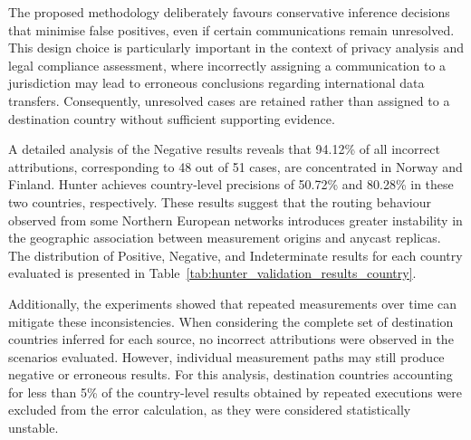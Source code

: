 The proposed methodology deliberately favours conservative inference decisions that minimise false positives, even if certain communications remain unresolved. This design choice is particularly important in the context of privacy analysis and legal compliance assessment, where incorrectly assigning a communication to a jurisdiction may lead to erroneous conclusions regarding international data transfers. Consequently, unresolved cases are retained rather than assigned to a destination country without sufficient supporting evidence.

A detailed analysis of the Negative results reveals that 94.12\% of all incorrect attributions, corresponding to 48 out of 51 cases, are concentrated in Norway and Finland. Hunter achieves country-level precisions of 50.72\% and 80.28\% in these two countries, respectively. These results suggest that the routing behaviour observed from some Northern European networks introduces greater instability in the geographic association between measurement origins and anycast replicas. The distribution of Positive, Negative, and Indeterminate results for each country evaluated is presented in Table~\ref{tab:hunter_validation_results_country}.

Additionally, the experiments showed that repeated measurements over time can mitigate these inconsistencies. When considering the complete set of destination countries inferred for each source, no incorrect attributions were observed in the scenarios evaluated. However, individual measurement paths may still produce negative or erroneous results. For this analysis, destination countries accounting for less than 5\% of the country-level results obtained by repeated executions were excluded from the error calculation, as they were considered statistically unstable.

